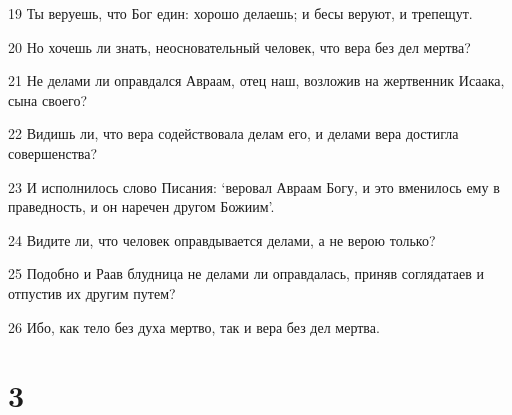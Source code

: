 \par 19 Ты веруешь, что Бог един: хорошо делаешь; и бесы веруют, и трепещут.
\par 20 Но хочешь ли знать, неосновательный человек, что вера без дел мертва?
\par 21 Не делами ли оправдался Авраам, отец наш, возложив на жертвенник Исаака, сына своего?
\par 22 Видишь ли, что вера содействовала делам его, и делами вера достигла совершенства?
\par 23 И исполнилось слово Писания: `веровал Авраам Богу, и это вменилось ему в праведность, и он наречен другом Божиим'.
\par 24 Видите ли, что человек оправдывается делами, а не верою только?
\par 25 Подобно и Раав блудница не делами ли оправдалась, приняв соглядатаев и отпустив их другим путем?
\par 26 Ибо, как тело без духа мертво, так и вера без дел мертва.

\chapter{3}

